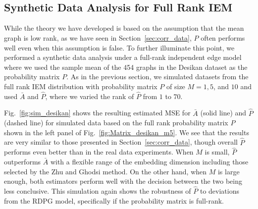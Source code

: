 \documentclass[10pt,letterpaper]{article}
\renewcommand{\hat}{\widehat}
\begin{document}
%
%


\subsection{Synthetic Data Analysis for Full Rank IEM}\label{sec:sim_iem}

While the theory we have developed is based on the assumption that the mean graph is low rank, as we have seen in Section~\ref{sec:corr_data}, $\hat{P}$ often performs well even when this assumption is false. 
To further illuminate this point, we performed a synthetic data analysis under a full-rank independent edge model where we used the sample mean of the 454 graphs in the Desikan dataset as the probability matrix $P$.
As in the previous section, we simulated datasets from the full rank IEM distribution with probability matrix $P$ of size $M=1,5$, and $10$ and used $\bar{A}$ and $\hat{P}$, where we varied the rank of $\hat{P}$ from $1$ to $70$.

Fig.~\ref{fig:sim_desikan} shows the resulting estimated MSE for $\bar{A}$ (solid line) and $\hat{P}$ (dashed line) for simulated data based on the full rank probability matrix $P$ shown in the left panel of Fig.~\ref{fig:Matrix_desikan_m5}.
We see that the results are very similar to those presented in Section~\ref{sec:corr_data}, though overall $\hat{P}$ performs even better than in the real data experiments. 
When $M$ is small, $\hat{P}$ outperforms $\bar{A}$ with a flexible range of the embedding dimension including those selected by the Zhu and Ghodsi method.
On the other hand, when $M$ is large enough, both estimators perform well with the decision between the two being less conclusive.
This simulation again shows the robustness of $\hat{P}$ to deviations from the RDPG model, specifically if the probability matrix is full-rank.
\end{document}
